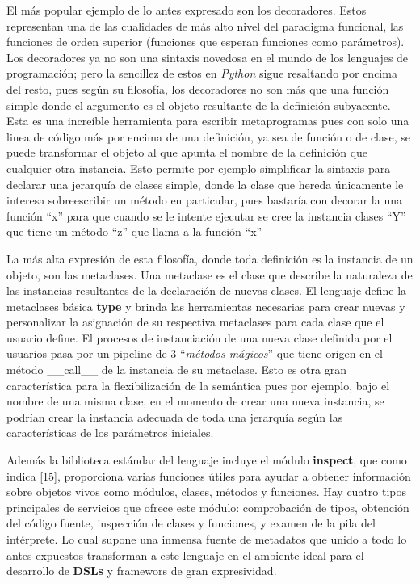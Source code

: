 El más popular ejemplo de lo antes expresado son los decoradores. Estos representan una de las
cualidades de más alto nivel del paradigma funcional, las funciones de orden superior (funciones
que esperan funciones como parámetros). Los decoradores ya no son una sintaxis novedosa en el
mundo de los lenguajes de programación; pero la sencillez de estos en {\it Python} sigue resaltando
por encima del resto, pues según su filosofía, los decoradores no son más que una función
simple donde el argumento es el objeto resultante de la definición subyacente. Esta es una
increíble herramienta para escribir metaprogramas pues con solo una linea de código más por
encima de una definición, ya sea de función o de clase, se puede transformar el objeto al que
apunta el nombre de la definición que cualquier otra instancia. Esto permite por ejemplo
simplificar la sintaxis para declarar una jerarquía de clases simple, donde la clase que hereda
únicamente le interesa sobreescribir un método en particular, pues bastaría con decorar la
una función ``x'' para que cuando se le intente ejecutar se cree la instancia clases ``Y''
que tiene un método ``z'' que llama a la función ``x''

La más alta expresión de esta filosofía, donde toda definición es la instancia de un objeto,
son las metaclases. Una metaclase es el clase que describe la naturaleza de las instancias
resultantes de la declaración de nuevas clases. El lenguaje define la metaclases básica
{\bf type} y brinda las herramientas necesarias para crear nuevas y personalizar la asignación
de su respectiva metaclases para cada clase que el usuario define. El procesos de instanciación
de una nueva clase definida por el usuarios pasa por un pipeline de 3 ``{\it métodos mágicos}'' que
tiene origen en el método \_\_call\_\_ de la instancia de su metaclase. Esto es otra gran
característica para la flexibilización de la semántica pues por ejemplo, bajo el nombre de una
misma clase, en el momento de crear una nueva instancia, se podrían crear la instancia adecuada
de toda una jerarquía según las características de los parámetros iniciales.

Además la biblioteca estándar del lenguaje incluye el módulo {\bf inspect}, que como indica [15],
proporciona varias funciones útiles para ayudar a obtener información sobre objetos vivos
como módulos, clases, métodos y funciones. Hay cuatro tipos principales de servicios que ofrece
este módulo: comprobación de tipos, obtención del código fuente, inspección de clases y funciones,
y examen de la pila del intérprete. Lo cual supone una inmensa fuente de metadatos que unido
a todo lo antes expuestos transforman a este lenguaje en el ambiente ideal para el desarrollo de
    {\bf DSLs} y framewors de gran expresividad.

